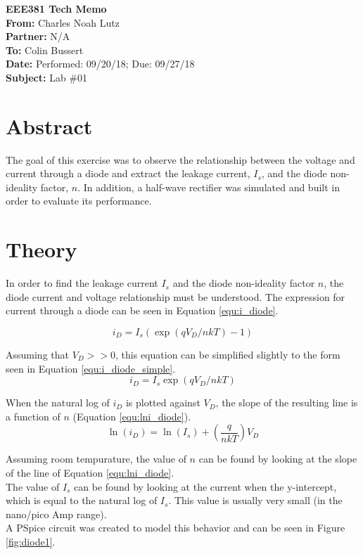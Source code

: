 \documentclass[11pt]{article}
\begin{document}
	{\Huge\textbf{EEE381 Tech Memo}}\\
	\hfill \break
	\textbf{From:} Charles Noah Lutz\\
	\textbf{Partner:} N/A\\
	\textbf{To:} Colin Bussert\\
	\textbf{Date:} Performed: 09/20/18; Due: 09/27/18\\
	\textbf{Subject:} Lab \#01

	\section{Abstract}
	The goal of this exercise was to observe the relationship between the
	voltage and current through a diode and extract the leakage current, \(I_{s}\), and
	the diode non-ideality factor, \(n\). In addition, a half-wave rectifier was simulated
	and built in order to evaluate its performance.

	\section{Theory}
	\label{sec:theory}
	In order to find the leakage current \(I_{s}\) and the diode non-ideality factor \(n\),
	the diode current and voltage relationship must be understood. The expression for 
	current through a diode can be seen in Equation \ref{equ:i_diode}.

	\begin{equation}
		\label{equ:i_diode}
		i_{D} = I_{s} (\exp(qV_{D}/nkT)-1)
	\end{equation}

	Assuming that \(V_{D} >> 0\), this equation can be simplified slightly to the form
	seen in Equation \ref{equ:i_diode_simple}.
	\begin{equation}
		\label{equ:i_diode_simple}
		i_{D} = I_{s} \exp(qV_{D}/nkT)
	\end{equation}
	
	When the natural log of \(i_{D}\) is plotted against \(V_{D}\), the slope of the
	resulting line is a function of \(n\) (Equation \ref{equ:lni_diode}).
	\begin{equation}
		\label{equ:lni_diode}
		\ln(i_{D}) = \ln(I_{s}) + (\frac{q}{nkT})V_{D}
	\end{equation}

	Assuming room tempurature, the value of \(n\) can be found by looking at the slope
	of the line of Equation \ref{equ:lni_diode}.\\
	\hfill \break
	The value of \(I_{s}\) can be found by looking at the current when the y-intercept,
	which is equal to the natural log of \(I_s\). This value is usually very small 
	(in the nano/pico Amp range).\\
	\hfill \break
	A PSpice circuit was created to model this behavior and can be seen in Figure 
	\ref{fig:diode1}.
\end{document}
